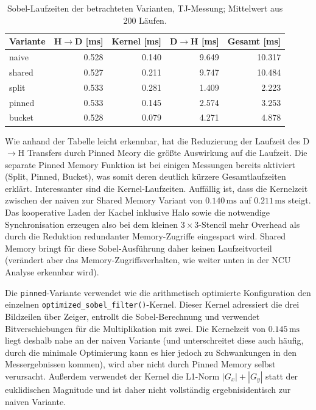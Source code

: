 \begin{table}[H]
    \centering
    \setlength{\tabcolsep}{4pt}
    \begin{tabularx}{\textwidth}{l R R R R}
        \toprule
        Variante & H$\to$D [ms] & Kernel [ms] & D$\to$H [ms] & Gesamt [ms] \\
        \midrule
        naive  & 0.528 & 0.140 & 9.649 & 10.317 \\
        shared & 0.527 & 0.211 & 9.747 & 10.484 \\
        split  & 0.533 & 0.281 & 1.409 & 2.223 \\
        pinned & 0.533 & 0.145 & 2.574 & 3.253 \\
        bucket & 0.528 & 0.079 & 4.271 & 4.878 \\
        \bottomrule
    \end{tabularx}
    \caption{Sobel-Laufzeiten der betrachteten Varianten, TJ-Messung;
        Mittelwert aus 200 Läufen.}
    \label{tab:sobel-runtime-selected}
\end{table}

Wie anhand der Tabelle leicht erkennbar, hat die Reduzierung der Laufzeit des D$\to$H Transfers durch Pinned Meory die größte Auswirkung auf die Laufzeit. Die separate Pinned Memory Funktion ist bei einigen Messungen bereits aktiviert (Split, Pinned, Bucket), was somit deren deutlich kürzere Gesamtlaufzeiten erklärt. Interessanter sind die Kernel-Laufzeiten. Auffällig ist, dass die Kernelzeit zwischen der naiven zur Shared Memory Variant von $0.140\,\mathrm{ms}$ auf
$0.211\,\mathrm{ms}$ steigt. Das kooperative Laden der Kachel inklusive Halo sowie
die notwendige Synchronisation erzeugen also bei dem kleinen $3 \times 3$-Stencil
mehr Overhead als durch die Reduktion redundanter Memory-Zugriffe
eingespart wird. Shared Memory bringt für diese Sobel-Ausführung daher keinen
Laufzeitvorteil (verändert aber das Memory-Zugriffsverhalten, wie weiter unten in der NCU Analyse erkennbar wird).

Die \texttt{pinned}-Variante verwendet wie die arithmetisch optimierte
Konfiguration den einzelnen \texttt{optimized\_sobel\_filter()}-Kernel. Dieser
Kernel adressiert die drei Bildzeilen über Zeiger, entrollt die
Sobel-Berechnung und verwendet Bitverschiebungen für die Multiplikation mit
zwei. Die Kernelzeit von $0.145\,\mathrm{ms}$ liegt deshalb nahe an der
naiven Variante (und unterschreitet diese auch häufig, durch die minimale Optimierung kann es hier jedoch zu Schwankungen in den Messergebnissen kommen), wird aber nicht durch Pinned Memory selbst verursacht. Außerdem verwendet der Kernel die L1-Norm $|G_x|+|G_y|$ statt der euklidischen Magnitude und ist daher nicht vollständig ergebnisidentisch zur naiven Variante.

